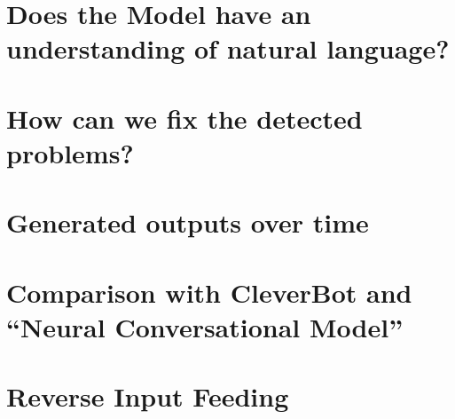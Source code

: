 \section{Does the Model have an understanding of natural language?}
\blindtext

\section{How can we fix the detected problems?}
\blindtext



\section{Generated outputs over time}
\blindtext

\section{Comparison with CleverBot and ``Neural Conversational Model''}
\blindtext


\section{Reverse Input Feeding}
\blindtext